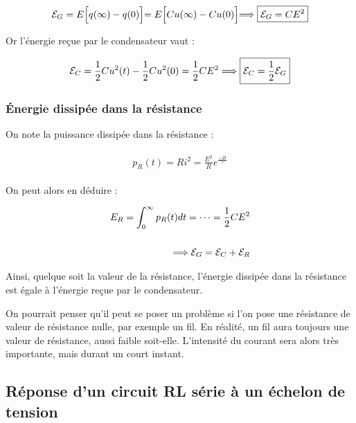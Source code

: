 \documentclass{article}
\begin{document}

\begin{align*}\begin{split}
\mathcal{E}_G=E\Bigl[q(\infty)-q(0)\Bigl] = E\Bigl[Cu(\infty)-Cu(0)\Bigl]
\Longrightarrow \boxed{\mathcal{E}_G=CE^2}
\end{split}\end{align*}

Or l'énergie reçue par le condensateur vaut :

\begin{align*}\begin{split}
\mathcal{E}_C=\frac{1}{2}Cu^2(t)-\frac{1}{2}Cu^2(0)=\frac{1}{2}CE^2
\Longrightarrow \boxed{\mathcal{E}_C = \frac{1}{2}\mathcal{E}_G}
\end{split}\end{align*}

\subsubsection{Énergie dissipée dans la résistance}

On note la puissance dissipée dans la résistance :

\begin{align*}\begin{split}
p_R(t)=Ri^2=\frac{E^2}{R}e^\frac{-2t}{\tau}
\end{split}\end{align*}

On peut alors en déduire :

\begin{align*}\begin{split}
E_R=\int_{0}^{\infty}p_R(t)dt = \dots = \frac{1}{2}CE^2\\\\
\Longrightarrow \mathcal{E}_G=\mathcal{E}_C+\mathcal{E}_R
\end{split}\end{align*}

Ainsi, quelque soit la valeur de la résistance, l'énergie dissipée dans la résistance est égale à l'énergie reçue par le condensateur.

On pourrait penser qu'il peut se poser un problème si l'on pose une résistance de valeur de résistance nulle, par exemple un fil. En réalité, un fil aura toujours une valeur de résistance, aussi faible soit-elle. L'intensité du courant sera alors très importante, mais durant un court instant.

\subsection{Réponse d'un circuit RL série à un échelon de tension}
\end{document}
